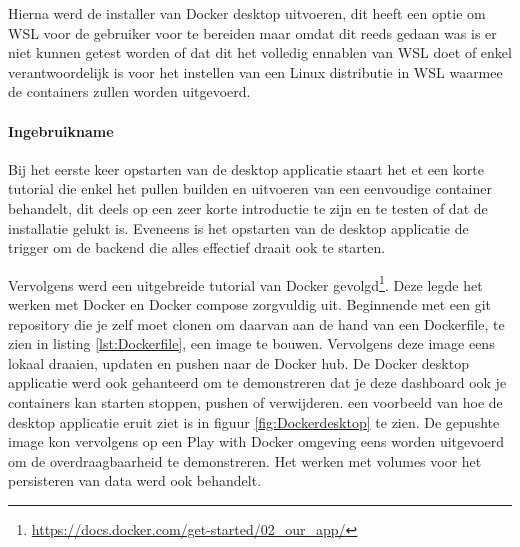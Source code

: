 Hierna werd de installer van Docker desktop uitvoeren, dit heeft een optie om WSL voor de gebruiker voor te bereiden maar omdat dit reeds gedaan was is er niet kunnen getest worden of dat dit het volledig ennablen van WSL doet of enkel verantwoordelijk is voor het instellen van een Linux distributie in WSL waarmee de containers zullen worden uitgevoerd.

\paragraph{Ingebruikname}
Bij het eerste keer opstarten van de desktop applicatie staart het et een korte tutorial die enkel het pullen builden en uitvoeren van een eenvoudige container behandelt,  dit deels op een zeer korte introductie te zijn en te testen of dat de installatie gelukt is. Eveneens is het opstarten van de desktop applicatie de trigger om de backend die alles effectief draait ook te starten.

Vervolgens werd een uitgebreide tutorial van Docker gevolgd\footnote{\url{https://docs.docker.com/get-started/02_our_app/}}. Deze legde het werken met Docker en Docker compose zorgvuldig uit. Beginnende met een git repository die je zelf moet clonen om daarvan aan de hand van een Dockerfile, te zien in listing \ref{lst:Dockerfile}, een image te bouwen. Vervolgens deze image eens lokaal draaien, updaten en pushen naar de Docker hub. De Docker desktop applicatie werd ook gehanteerd om te demonstreren dat je deze dashboard ook je containers kan starten stoppen, pushen of verwijderen. een voorbeeld van hoe de desktop applicatie eruit ziet is in figuur \ref{fig:Dockerdesktop} te zien. De gepushte image kon vervolgens op een Play with Docker omgeving eens worden uitgevoerd om de overdraagbaarheid te demonstreren. Het werken met volumes voor het persisteren van data werd ook behandelt. 

